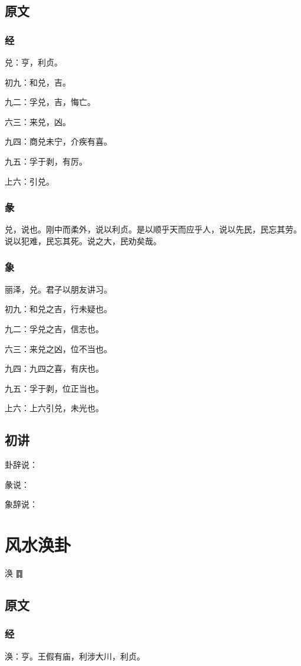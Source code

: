 \documentclass[12pt,oneside]{book}
\begin{document}
\section{原文}

\subsection{经}
兑：亨，利贞。

初九：和兑，吉。

九二：孚兑，吉，悔亡。

六三：来兑，凶。

九四：商兑未宁，介疾有喜。

九五：孚于剥，有厉。

上六：引兑。

\subsection{彖}
兑，说也。刚中而柔外，说以利贞。是以顺乎天而应乎人，说以先民，民忘其劳。说以犯难，民忘其死。说之大，民劝矣哉。

\subsection{象}
丽泽，兑。君子以朋友讲习。

初九：和兑之吉，行未疑也。

九二：孚兑之吉，信志也。

六三：来兑之凶，位不当也。

九四：九四之喜，有庆也。

九五：孚于剥，位正当也。

上六：上六引兑，未光也。

\section{初讲}
卦辞说：

彖说：

象辞说：

\chapter{风水涣卦}
涣 {\Large ䷺}

\section{原文}

\subsection{经}
涣：亨。王假有庙，利涉大川，利贞。
\end{document}
